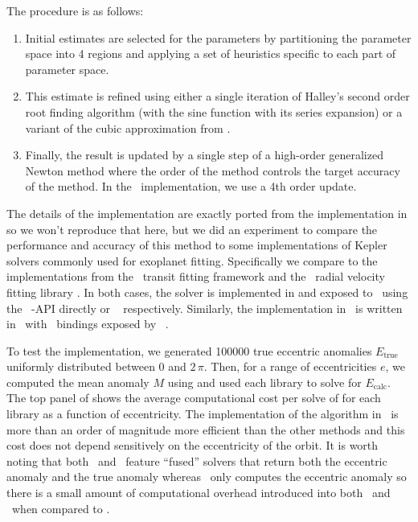 \documentclass[modern]{aastex62}
\begin{document}
The procedure is as follows:
\begin{enumerate}

\item Initial estimates are selected for the parameters by partitioning the
parameter space into 4 regions and applying a set of heuristics specific to
each part of parameter space.

\item This estimate is refined using either a single iteration of Halley's
second order root finding algorithm (with the sine function with its series
expansion) or a variant of the cubic approximation from \citet{Mikkola:1987}.

\item Finally, the result is updated by a single step of a high-order
generalized Newton method where the order of the method controls the target
accuracy of the method. In the \exoplanet\ implementation, we use a 4th order
update.

\end{enumerate}

The details of the implementation are exactly ported from the implementation
in \citet{Nijenhuis:1991} so we won't reproduce that here, but we did an
experiment to compare the performance and accuracy of this method to some
implementations of Kepler solvers commonly used for exoplanet fitting.
Specifically we compare to the implementations from the \batman\ transit
fitting framework \citep{Kreidberg:2015} and the \radvel\ radial velocity
fitting library \citep{Fulton:2017, Fulton:2018}.
In both cases, the solver is implemented in  and exposed to
\python\ using the \python\ -API directly or \cython\
\citep{Behnel:2011} respectively.
Similarly, the implementation in \exoplanet\ is written in \cpp\ with \python\
bindings exposed by \theano\ \citep{Theano-Development-Team:2016}.

To test the implementation, we generated 100000 true eccentric anomalies
$E_\mathrm{true}$ uniformly distributed between $0$ and $2\,\pi$.
Then, for a range of eccentricities $e$, we computed the mean anomaly $M$ using
 and used each library to solve \eq{kepler-equation} for
$E_\mathrm{calc}$.
The top panel of \Figure{kepler_solver} shows the average computational cost per
solve of  for each library as a function of eccentricity.
The implementation of the \citet{Nijenhuis:1991} algorithm in \exoplanet\ is
more than an order of magnitude more efficient than the other methods and this
cost does not depend sensitively on the eccentricity of the orbit.
It is worth noting that both \batman\ and \exoplanet\ feature ``fused''
solvers that return both the eccentric anomaly and the true anomaly whereas
\radvel\ only computes the eccentric anomaly so there is a small amount of
computational overhead introduced into both \exoplanet\ and \batman\ when
compared to \radvel.
\end{document}
